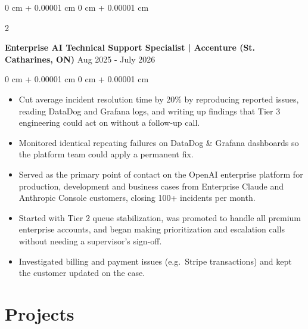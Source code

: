 \documentclass[10pt, letterpaper]{article}
\newenvironment{highlights}{
    \begin{itemize}[
        topsep=0.10 cm,
        parsep=0.10 cm,
        partopsep=0pt,
        itemsep=0pt,
        leftmargin=0 cm + 10pt
    ]
}{
    \end{itemize}
} %
\newenvironment{onecolentry}{
    \begin{adjustwidth}{
        0 cm + 0.00001 cm
    }{
        0 cm + 0.00001 cm
    }
}{
    \end{adjustwidth}
} %
\newenvironment{twocolentry}[2][]{
    \onecolentry
    \def\secondColumn{#2}
    \setcolumnwidth{\fill, 4.5 cm}
    \begin{paracol}{2}
}{
    \switchcolumn \raggedleft \secondColumn
    \end{paracol}
    \endonecolentry
} %
\begin{document}
        \begin{twocolentry}{
            {Aug 2025 - July 2026}
        }
            \textbf{Enterprise AI Technical Support Specialist | Accenture (St. Catharines, ON)}\end{twocolentry}
        \vspace{0.10 cm}
        \begin{onecolentry}
            \begin{highlights}
                \item Cut average incident resolution time by 20\% by reproducing reported issues, reading DataDog and Grafana logs, and writing up findings that Tier 3 engineering could act on without a follow-up call.
                \item Monitored identical repeating failures on DataDog \& Grafana dashboards so the platform team could apply a permanent fix.
                \item Served as the primary point of contact on the OpenAI enterprise platform for production, development and business cases from Enterprise Claude and Anthropic Console customers, closing 100+ incidents per month.
                \item Started with Tier 2 queue stabilization, was promoted to handle all premium enterprise accounts, and began making prioritization and escalation calls without needing a supervisor's sign-off.
                \item Investigated billing and payment issues (e.g.\ Stripe transactions) and kept the customer updated on the case.
            \end{highlights}
        \end{onecolentry}

    \section{Projects}
\end{document}
